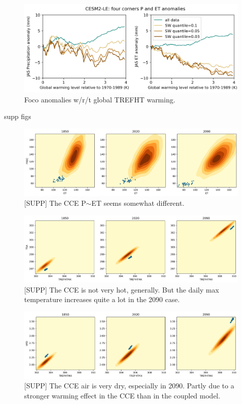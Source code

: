 \documentclass[11pt]{article}
\begin{document}
\begin{figure}[h]
\centering
\includegraphics[width=40pc]{figs/main/anomalies.png}
\caption{Foco anomalies w/r/t global TREFHT warming.}
\label{fig:anomalies}
\end{figure}


\clearpage

supp figs
\begin{figure}[h]
\centering
\includegraphics[width=40pc]{figs/contours/ET_PREC_contours.png}
\caption{[SUPP] The CCE P$\sim$ET seems somewhat different.}
\label{fig:precip}
\end{figure}

\begin{figure}[h]
\centering
\includegraphics[width=40pc]{figs/contours/TREFHTMX_TSA_contours.png}
\caption{[SUPP] The CCE is not very hot, generally. But the daily max temperature increases quite a lot in the 2090 case. }
\label{fig:precip}
\end{figure}

\begin{figure}[h]
\centering
\includegraphics[width=40pc]{figs/contours/TREFHTMX_VPD_contours.png}
\caption{[SUPP] The CCE air is very dry, especially in 2090. Partly due to a stronger warming effect in the CCE than in the coupled model.}
\label{fig:precip}
\end{figure}
\end{document}
